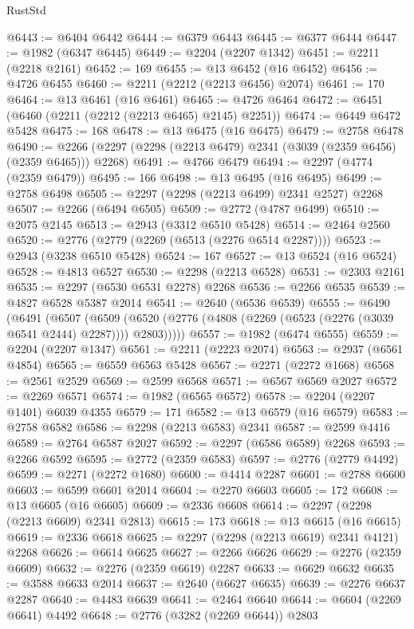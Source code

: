 \begin{lexlean}{RustStd}
\begin{coremodule}
@6443 := @6404 @6442
@6444 := @6379 @6443
@6445 := @6377 @6444
@6447 := @1982 (@6347 @6445)
@6449 := @2204 (@2207 @1342)
@6451 := @2211 (@2218 @2161)
@6452 := 169
@6455 := @13 @6452 (@16 @6452)
@6456 := @4726 @6455
@6460 := @2211 (@2212 (@2213 @6456) @2074)
@6461 := 170
@6464 := @13 @6461 (@16 @6461)
@6465 := @4726 @6464
@6472 := @6451 (@6460 (@2211 (@2212 (@2213 @6465) @2145) @2251))
@6474 := @6449 @6472 @5428
@6475 := 168
@6478 := @13 @6475 (@16 @6475)
@6479 := @2758 @6478
@6490 := @2266 (@2297 (@2298 (@2213 @6479) @2341 (@3039 (@2359 @6456) (@2359 @6465))) @2268)
@6491 := @4766 @6479
@6494 := @2297 (@4774 (@2359 @6479))
@6495 := 166
@6498 := @13 @6495 (@16 @6495)
@6499 := @2758 @6498
@6505 := @2297 (@2298 (@2213 @6499) @2341 @2527) @2268
@6507 := @2266 (@6494 @6505)
@6509 := @2772 (@4787 @6499)
@6510 := @2075 @2145
@6513 := @2943 (@3312 @6510 @5428)
@6514 := @2464 @2560
@6520 := @2776 (@2779 (@2269 (@6513 (@2276 @6514 @2287))))
@6523 := @2943 (@3238 @6510 @5428)
@6524 := 167
@6527 := @13 @6524 (@16 @6524)
@6528 := @4813 @6527
@6530 := @2298 (@2213 @6528)
@6531 := @2303 @2161
@6535 := @2297 (@6530 @6531 @2278) @2268
@6536 := @2266 @6535
@6539 := @4827 @6528 @5387 @2014
@6541 := @2640 (@6536 @6539)
@6555 := @6490
    (@6491
      (@6507
        (@6509 (@6520 (@2776 (@4808 (@2269 (@6523 (@2276 (@3039 @6541 @2444) @2287)))) @2803)))))
@6557 := @1982 (@6474 @6555)
@6559 := @2204 (@2207 @1347)
@6561 := @2211 (@2223 @2074)
@6563 := @2937 (@6561 @4854)
@6565 := @6559 @6563 @5428
@6567 := @2271 (@2272 @1668)
@6568 := @2561 @2529
@6569 := @2599 @6568
@6571 := @6567 @6569 @2027
@6572 := @2269 @6571
@6574 := @1982 (@6565 @6572)
@6578 := @2204 (@2207 @1401) @6039 @4355
@6579 := 171
@6582 := @13 @6579 (@16 @6579)
@6583 := @2758 @6582
@6586 := @2298 (@2213 @6583) @2341
@6587 := @2599 @4416
@6589 := @2764 @6587 @2027
@6592 := @2297 (@6586 @6589) @2268
@6593 := @2266 @6592
@6595 := @2772 (@2359 @6583)
@6597 := @2776 (@2779 @4492)
@6599 := @2271 (@2272 @1680)
@6600 := @4414 @2287
@6601 := @2788 @6600
@6603 := @6599 @6601 @2014
@6604 := @2270 @6603
@6605 := 172
@6608 := @13 @6605 (@16 @6605)
@6609 := @2336 @6608
@6614 := @2297 (@2298 (@2213 @6609) @2341 @2813)
@6615 := 173
@6618 := @13 @6615 (@16 @6615)
@6619 := @2336 @6618
@6625 := @2297 (@2298 (@2213 @6619) @2341 @4121) @2268
@6626 := @6614 @6625
@6627 := @2266 @6626
@6629 := @2276 (@2359 @6609)
@6632 := @2276 (@2359 @6619) @2287
@6633 := @6629 @6632
@6635 := @3588 @6633 @2014
@6637 := @2640 (@6627 @6635)
@6639 := @2276 @6637 @2287
@6640 := @4483 @6639
@6641 := @2464 @6640
@6644 := @6604 (@2269 @6641) @4492
@6648 := @2776 (@3282 (@2269 @6644)) @2803

\end{coremodule}
\end{lexlean}
